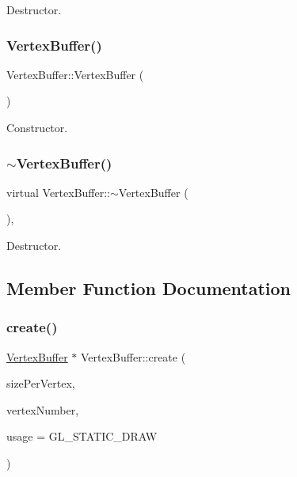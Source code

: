 Destructor. \mbox{\label{classVertexBuffer_adb25d82a47ad82d5b69a75ac111401b8}} 
\subsubsection{\texorpdfstring{Vertex\+Buffer()}{VertexBuffer()}\hspace{0.1cm}{\footnotesize\ttfamily [2/2]}}
{\footnotesize\ttfamily Vertex\+Buffer\+::\+Vertex\+Buffer (\begin{DoxyParamCaption}{ }\end{DoxyParamCaption})\hspace{0.3cm}{\ttfamily [protected]}}

Constructor. \mbox{\label{classVertexBuffer_a0ce3e9efa25da1efb9e80d19dbf1503f}} 
\subsubsection{\texorpdfstring{$\sim$\+Vertex\+Buffer()}{~VertexBuffer()}\hspace{0.1cm}{\footnotesize\ttfamily [2/2]}}
{\footnotesize\ttfamily virtual Vertex\+Buffer\+::$\sim$\+Vertex\+Buffer (\begin{DoxyParamCaption}{ }\end{DoxyParamCaption})\hspace{0.3cm}{\ttfamily [protected]}, {\ttfamily [virtual]}}

Destructor. 

\subsection{Member Function Documentation}
\mbox{\label{classVertexBuffer_a493af822ba109251e4e108f06d6b58d6}} 
\subsubsection{\texorpdfstring{create()}{create()}\hspace{0.1cm}{\footnotesize\ttfamily [1/2]}}
{\footnotesize\ttfamily \hyperlink{classVertexBuffer}{Vertex\+Buffer} $\ast$ Vertex\+Buffer\+::create (\begin{DoxyParamCaption}\item[{int}]{size\+Per\+Vertex,  }\item[{int}]{vertex\+Number,  }\item[{G\+Lenum}]{usage = {\ttfamily GL\+\_\+STATIC\+\_\+DRAW} }\end{DoxyParamCaption})\hspace{0.3cm}{\ttfamily [static]}}

